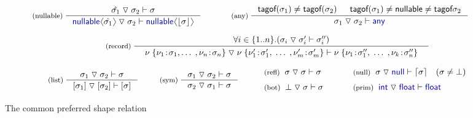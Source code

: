 \documentclass[10pt,preprint,blind,clearpagebib]{sigplanconf}
\newcommand{\langl}{\begin{picture}(4.5,7)
\put(1.1,2.5){\rotatebox{60}{\line(1,0){5.5}}}
\put(1.1,2.5){\rotatebox{300}{\line(1,0){5.5}}}
\end{picture}}
\newcommand{\rangl}{\begin{picture}(4.5,7)
\put(.9,2.5){\rotatebox{120}{\line(1,0){5.5}}}
\put(.9,2.5){\rotatebox{240}{\line(1,0){5.5}}}
\end{picture}}
\newcommand{\kvd}[1]{\textnormal{\textcolor{kvdclr}{\sffamily #1}}}
\newcommand{\ident}[1]{\textnormal{\sffamily #1}}
\newcommand{\tsep}[0]{\; \triangledown \;}
\newcommand{\dropopt}[1]{\lfloor#1\rfloor}
\newcommand{\addopt}[1]{\lceil#1\rceil}
\newcommand{\tytagof}{\ident{tagof}}
\begin{document}
\begin{figure}[t]
\vspace{-0.5em}
\begin{equation*}
\inference[(nullable)\;]
  {\hat{\sigma_1} \tsep \sigma_2 \vdash \sigma}
  {\kvd{nullable}\langl\hat{\sigma_1}\rangl \tsep \sigma_2 \vdash \kvd{nullable}\langl\dropopt{\sigma}\rangl}
\qquad
\inference[(any)\;]
  { \tytagof(\sigma_1) \neq \tytagof(\sigma_2) & \tytagof(\sigma_1) \neq \ident{nullable} \neq \tytagof{\sigma_2}}
  { \sigma_1 \tsep \sigma_2 \vdash \kvd{any} }  
\end{equation*}
\vspace{-2em}

\begin{equation*}
\hspace{4em}
\inference[(record)\;]
  { \forall i\in\{ 1 .. n \}.(\sigma_i \tsep \sigma'_i \vdash \sigma''_i) }
  { \begin{array}{l}
    \nu \; \{ \nu_1 \!:\! \sigma_1,  \ldots \;, \nu_n \!:\! \sigma_n \} \tsep
    \nu \; \{ \nu'_1 \!:\! \sigma'_1, \; \ldots \;, \nu'_m \!:\! \sigma'_m \} \vdash
    \nu \; \{ \nu_1 \!:\! \sigma''_1, \; \ldots \; , \nu_k \!:\! \sigma''_n \}
    \end{array} }
\end{equation*}
\vspace{-2em}

\begin{equation*}
\hspace{2em}
\inference[(list)\;]
  {\sigma_1 \tsep \sigma_2 \vdash \sigma}
  {[\sigma_1] \tsep [\sigma_2] \vdash [\sigma]}
\quad
\inference[(sym)\;]
  {\sigma_1 \tsep \sigma_2 \vdash \sigma}
  {\sigma_2 \tsep \sigma_1 \vdash \sigma}
%
\quad
\begin{array}{l}
 \textnormal{\footnotesize{(refl)}}\;\; \sigma \tsep \sigma \vdash \sigma\\[0.6em]
 \textnormal{\footnotesize{(bot)}}\;\; \bot \tsep \sigma \vdash \sigma
\end{array}
%
\quad
\begin{array}{l}
 \textnormal{\footnotesize{(null)}}\;\; \sigma \tsep \kvd{null} \vdash \addopt{\sigma} \quad (\sigma \neq \bot)\\[0.6em]
 \textnormal{\footnotesize{(prim)}}\;\; \kvd{int} \tsep \kvd{float} \vdash \kvd{float}
\end{array}
\end{equation*}

\caption{The common preferred shape relation}
\label{fig:subtyping-cst}
\end{figure}
\end{document}
